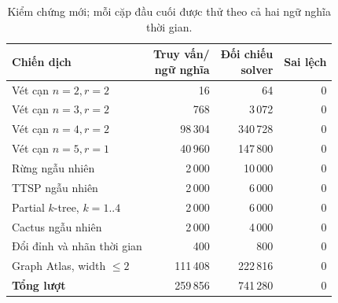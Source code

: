 \begin{table}[htbp]
\centering
\small
\setlength{\tabcolsep}{4pt}
\caption{Kiểm chứng mới; mỗi cặp đầu cuối được thử theo cả hai ngữ nghĩa thời gian.}
\label{tab:audit-expanded}
\begin{tabular}{lrrr}
\toprule
Chiến dịch & \shortstack{Truy vấn/\\ngữ nghĩa} & \shortstack{Đối chiếu\\solver} & Sai lệch \\
\midrule
Vét cạn $n=2,r=2$ & 16 & 64 & 0 \\
Vét cạn $n=3,r=2$ & 768 & 3\,072 & 0 \\
Vét cạn $n=4,r=2$ & 98\,304 & 340\,728 & 0 \\
Vét cạn $n=5,r=1$ & 40\,960 & 147\,800 & 0 \\
Rừng ngẫu nhiên & 2\,000 & 10\,000 & 0 \\
TTSP ngẫu nhiên & 2\,000 & 6\,000 & 0 \\
Partial $k$-tree, $k=1..4$ & 2\,000 & 6\,000 & 0 \\
Cactus ngẫu nhiên & 2\,000 & 4\,000 & 0 \\
Đổi đỉnh và nhãn thời gian & 400 & 800 & 0 \\
Graph Atlas, width $\le2$ & 111\,408 & 222\,816 & 0 \\
\textbf{Tổng lượt} & 259\,856 & 741\,280 & 0 \\
\bottomrule
\end{tabular}
\end{table}
